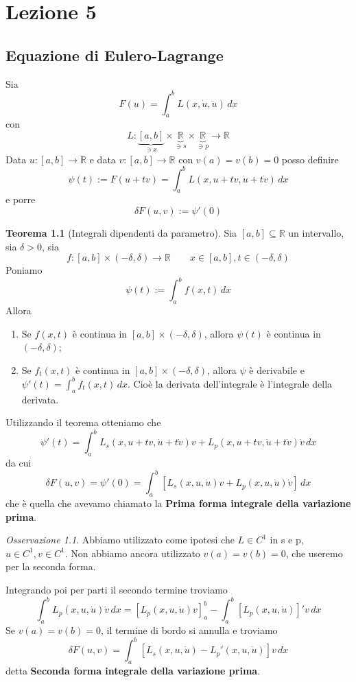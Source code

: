 \documentclass[a4paper]{book}
\theoremstyle{definition}
\theoremstyle{remark}
\newtheorem{oss}{Osservazione}
\theoremstyle{definition}
\newtheorem{teo}{Teorema}
\newcommand{\bbr}{\mathbb{R}}
\begin{document}
\chapter{Lezione 5}
\section{Equazione di Eulero-Lagrange}

Sia
\[
	F(u) = \int_{a}^{b}L(x, \dot{u}, \ddot{u})\, dx
\]
con 
\[
	L : \underbrace{[a,b]}_{\ni x}\times \underbrace{\bbr}_{\ni s}\times\underbrace{\bbr}_{\ni p} \to \bbr
\]
Data $u: [a,b] \to \bbr$ e data $v: [a,b] \to \bbr$ con $v(a)=v(b)=0$ posso definire
\[
	\psi(t) := F(u+tv) = \int_{a}^{b}L(x, u+tv, \dot{u} + t \dot{v})\, dx
\]
e porre 
\[
	\delta F(u,v) := \psi'(0)
\]

\begin{teo}[Integrali dipendenti da parametro]
Sia $[a,b] \subseteq \bbr$ un intervallo, sia $\delta >0$, sia 
\[
	f:[a,b]\times(-\delta, \delta) \to\bbr \qquad x \in [a,b], t\in (-\delta,\delta)
\]
Poniamo 
\[
	\psi(t) := \int_{a}^{b}f(x, t)\,dx
\]
Allora
\begin{enumerate}
\item{Se $f(x,t)$ è continua in $[a,b]\times(-\delta, \delta)$, allora $\psi(t)$ è continua in $(-\delta,\delta)$;}
\item{Se $f_t(x,t)$ è continua in $[a,b]\times(-\delta,\delta)$, allora $\psi$ è derivabile e \\ $\psi '(t) = \int_{a}^{b}f_t(x,t)\,dx$. Cioè la derivata dell'integrale è l'integrale della derivata.}
\end{enumerate}
\end{teo}

Utilizzando il teorema otteniamo che
\[
	\psi '(t) = \int_{a}^{b}L_s(x, u+tv, \dot{u} + t\dot{v})v + L_p(x, u+tv, \dot{u} +t \dot{v}) \dot{v}\, dx
\]
da cui 
\[
	\delta F(u,v) = \psi'(0)=\int_{a}^{b}[L_s(x,u, \dot{u})v + L_p(x, u, \dot{u}) \dot{v}]\,dx
\]
che è quella che avevamo chiamato la \textbf{Prima forma integrale della variazione prima}.\\

\begin{oss}
Abbiamo utilizzato come ipotesi che $L \in C^1$ in s e p, $u \in C^1, v \in C^1$. Non abbiamo ancora utilizzato $v(a)=v(b)=0$, che useremo per la seconda forma.
\end{oss}

Integrando poi per parti il secondo termine troviamo 
\[
	\int_{a}^{b}L_p(x, u, \dot{u}) \dot{v}\,dx = [L_p(x, u, \dot{u})v]_a^b - \int_{a}^{b}[L_p(x, u, \dot{u})]' v\,dx
\]
Se $v(a)=v(b)=0$, il termine di bordo si annulla e troviamo
\[
	\delta F(u,v) = \int_{a}^{b}[L_s(x, u, \dot{u}) - L_p'(x, u, \dot{u})]v\,dx
\]
detta \textbf{Seconda forma integrale della variazione prima}.
\end{document}
